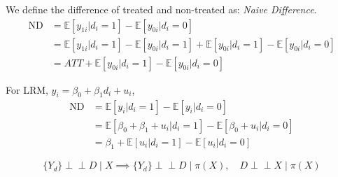 We define the difference of treated and non-treated as: \textit{Naive Difference}.
\begin{align*}
  \text{ND} &= \mathbb{E}[y_{1i} | d_i = 1] - \mathbb{E}[y_{0i} | d_i = 0]\\
  &= \mathbb{E}[y_{1i} | d_i = 1] - \mathbb{E}[y_{0i} | d_i = 1] + \mathbb{E}[y_{0i} | d_i =1] - \mathbb{E}[y_{0i} | d_i = 0] \\
  &= ATT + \mathbb{E}[y_{0i} | d_i = 1] - \mathbb{E}[y_{0i} | d_i = 0]
\end{align*}

For LRM, $y_i = \beta_0 + \beta_1 d_i + u_i$,
\begin{align*}
  \text{ND} &= \mathbb{E}[y_i | d_i = 1] - \mathbb{E}[y_i | d_i = 0]\\
  &= \mathbb{E}[\beta_0 + \beta_1 + u_i | d_i = 1] - \mathbb{E}[\beta_0 + u_i | d_i = 0]\\
  &= \beta_1 + \mathbb{E}[u_i | d_i = 1] - \mathbb{E}[u_i | d_i = 0]  
\end{align*}



\[
\{Y_d\} \perp\!\!\!\perp D \mid X \implies \{Y_d\} \perp\!\!\!\perp D \mid \pi(X), \quad D \perp\!\!\!\perp X \mid \pi(X)
\]